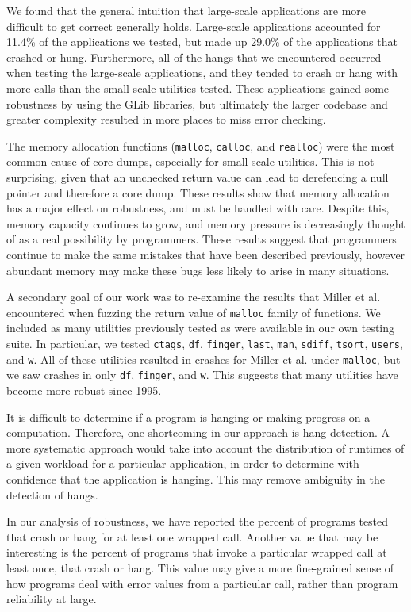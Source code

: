 We found that the general intuition that large-scale applications are more difficult to get correct generally holds. Large-scale applications accounted for 11.4\% of the applications we tested, but made up 29.0\% of the applications that crashed or hung. Furthermore, all of the hangs that we encountered occurred when testing the large-scale applications, and they tended to crash or hang with more calls than the small-scale utilities tested. These applications gained some robustness by using the GLib libraries, but ultimately the larger codebase and greater complexity resulted in more places to miss error checking.

The memory allocation functions (\texttt{malloc}, \texttt{calloc}, and \texttt{realloc}) were the most common cause of core dumps, especially for small-scale utilities. This is not surprising, given that an unchecked return value can lead to derefencing a null pointer and therefore a core dump. These results show that memory allocation has a major effect on robustness, and must be handled with care. Despite this, memory capacity continues to grow, and memory pressure is decreasingly thought of as a real possibility by programmers. These results suggest that programmers continue to make the same mistakes that have been described previously, however abundant memory may make these bugs less likely to arise in many situations.

A secondary goal of our work was to re-examine the results that Miller et al. encountered when fuzzing the return value of \texttt{malloc} family of functions. We included as many utilities previously tested as were available in our own testing suite. In particular, we tested \texttt{ctags}, \texttt{df}, \texttt{finger}, \texttt{last}, \texttt{man}, \texttt{sdiff}, \texttt{tsort}, \texttt{users}, and \texttt{w}. All of these utilities resulted in crashes for Miller et al. under \texttt{malloc}, but we saw crashes in only \texttt{df}, \texttt{finger}, and \texttt{w}. This suggests that many utilities have become more robust since 1995.  

It is difficult to determine if a program is hanging or making progress on a computation. Therefore, one shortcoming in our approach is hang detection. A more systematic approach would take into account the distribution of runtimes of a given workload for a particular application, in order to determine with confidence that the application is hanging. This may remove ambiguity in the detection of hangs.

In our analysis of robustness, we have reported the percent of programs tested that crash or hang for at least one wrapped call. Another value that may be interesting is the percent of programs that invoke a particular wrapped call at least once, that crash or hang. This value may give a more fine-grained sense of how programs deal with error values from a particular call, rather than program reliability at large.